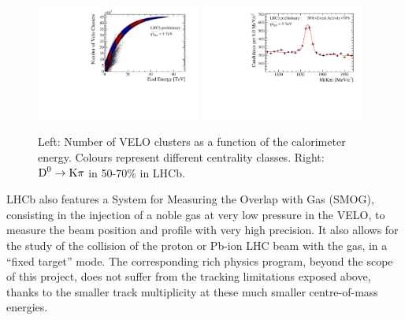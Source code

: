 \documentclass[a4paper,11pt]{article}
\begin{document}

\begin{figure}[htb]
  \begin{center}
    \includegraphics[width=0.48\textwidth]{plots/velo_vs_ecal.pdf}
    \includegraphics[width=0.48\textwidth]{plots/d0_ecalbin_70_50.pdf}
  \end{center}
  \caption{Left: Number of VELO clusters as a function of the calorimeter energy. Colours represent different centrality classes.
  Right: $\text{D}^0 \to \text{K}\pi$ in 50-70\% \pbpb in LHCb. 
  \label{fig:pbpblhcb}}
\end{figure}

LHCb also features a System for Measuring the Overlap with Gas (SMOG), consisting in the injection of a noble gas at very low pressure in the VELO, to measure the beam
position and profile with very high precision. It also allows for the study of the collision of the proton or Pb-ion LHC beam with the gas, in a ``fixed target'' mode.
The corresponding rich physics program, beyond the scope of this project, does not suffer from the tracking limitations exposed above, thanks to the smaller track multiplicity
at these much smaller centre-of-mass energies.
\end{document}
